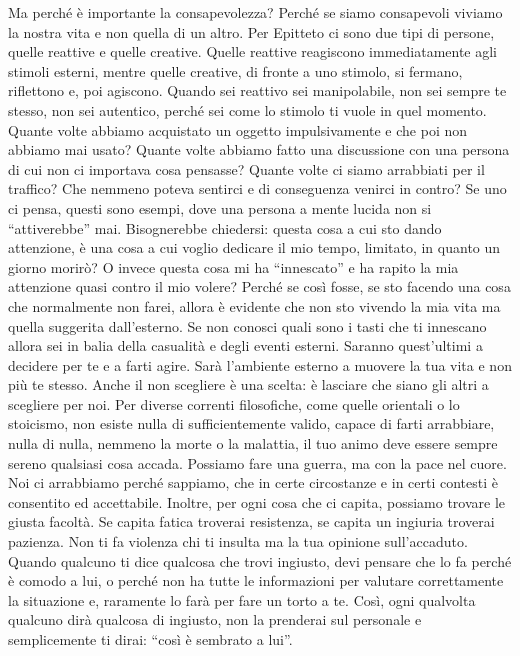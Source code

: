 \documentclass[12pt]{book} %
\begin{document}
Ma perché è importante la consapevolezza? Perché se siamo consapevoli viviamo la nostra vita e non quella di un altro.
Per Epitteto ci sono due tipi di persone, quelle reattive e quelle creative. Quelle reattive reagiscono immediatamente
agli stimoli esterni, mentre quelle creative, di fronte a uno stimolo, si fermano, riflettono e, poi agiscono. Quando
sei reattivo sei manipolabile, non sei sempre te stesso, non sei autentico, perché sei come lo stimolo ti vuole in quel
momento. Quante volte abbiamo acquistato un oggetto impulsivamente e che poi non abbiamo mai usato? Quante volte
abbiamo fatto una discussione con una persona di cui non ci importava cosa pensasse? Quante volte ci siamo arrabbiati
per il traffico? Che nemmeno poteva sentirci e di conseguenza venirci in contro? Se uno ci pensa, questi sono esempi,
dove una persona a mente lucida non si “attiverebbe” mai. Bisognerebbe chiedersi: questa cosa a cui sto dando
attenzione, è una cosa a cui voglio dedicare il mio tempo, limitato, in quanto un giorno morirò? O invece questa cosa
mi ha “innescato” e ha rapito la mia attenzione quasi contro il mio volere? Perché se così fosse, se sto facendo una
cosa che normalmente non farei, allora è evidente che non sto vivendo la mia vita ma quella suggerita
dall'esterno. Se non conosci quali sono i tasti che ti {\textquotedbl}innescano{\textquotedbl}
allora sei in balia della casualità e degli eventi esterni. Saranno quest'ultimi a decidere per te
e a farti agire. Sarà l'ambiente esterno a muovere la tua vita e non più te stesso. Anche il non scegliere è una
scelta: è lasciare che siano gli altri a scegliere per noi. Per diverse correnti filosofiche, come quelle orientali o
lo stoicismo, non esiste nulla di sufficientemente valido, capace di farti arrabbiare, nulla di nulla, nemmeno la morte
o la malattia, il tuo animo deve essere sempre sereno qualsiasi cosa accada. Possiamo fare una guerra, ma con la pace
nel cuore. Noi ci arrabbiamo perché sappiamo, che in certe circostanze e in certi contesti è consentito ed accettabile.
Inoltre, per ogni cosa che ci capita, possiamo trovare le giusta facoltà. Se capita fatica troverai resistenza, se
capita un ingiuria troverai pazienza. Non ti fa violenza chi ti insulta ma la tua opinione
sull'accaduto. Quando qualcuno ti dice qualcosa che trovi ingiusto, devi pensare che lo fa perché
è comodo a lui, o perché non ha tutte le informazioni per valutare correttamente la situazione e, raramente lo farà per
fare un torto a te. Così, ogni qualvolta qualcuno dirà qualcosa di ingiusto, non la prenderai sul personale e
semplicemente ti dirai: “così è sembrato a lui”.
\end{document}
